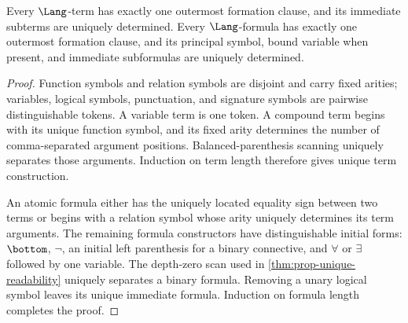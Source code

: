 \begin{theorem}
\label{thm:fol-unique-readability}
Every \(\Lang\)-term has exactly one outermost formation clause, and its
immediate subterms are uniquely determined.  Every \(\Lang\)-formula has
exactly one outermost formation clause, and its principal symbol, bound
variable when present, and immediate subformulas are uniquely determined.
\end{theorem}
\begin{proof}
Function symbols and relation symbols are disjoint and carry fixed arities;
variables, logical symbols, punctuation, and signature symbols are pairwise
distinguishable tokens.  A variable term is one token.  A compound term begins
with its unique function symbol, and its fixed arity determines the number of
comma-separated argument positions.  Balanced-parenthesis scanning uniquely
separates those arguments.  Induction on term length therefore gives unique
term construction.

An atomic formula either has the uniquely located equality sign between two
terms or begins with a relation symbol whose arity uniquely determines its
term arguments.  The remaining formula constructors have distinguishable
initial forms: \(\bottom\), \(\neg\), an initial left parenthesis for a binary
connective, and \(\forall\) or \(\exists\) followed by one variable.  The
depth-zero scan used in \cref{thm:prop-unique-readability} uniquely separates a
binary formula.  Removing a unary logical symbol leaves its unique immediate
formula.  Induction on formula length completes the proof.
\end{proof}

